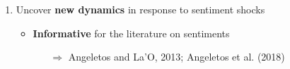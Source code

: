 \documentclass[hyperref={pdfpagelabels=false}]{beamer}
\begin{document}
{\begin{enumerate}
\bigskip

	\item Uncover \textbf{new dynamics} in response to sentiment shocks 
	\begin{itemize}
		\item \footnotesize{\textbf{Informative} for the literature on sentiments}
		\begin{itemize}
		\item[$\Rightarrow$] Angeletos and La'O, 2013; Angeletos et al. (2018)
		\end{itemize}
		
		
		

	

		\end{itemize}
	
	\bigskip
	

\end{enumerate}}
\end{document}
